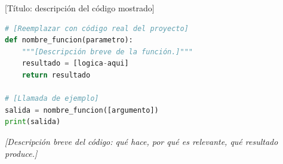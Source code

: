 \documentclass[aspectratio=169, 12pt]{beamer}
\begin{document}
\begin{frame}[fragile]{[Título: descripción del código mostrado]}
  \begin{tcolorbox}[cajaCode, top=2pt, bottom=2pt]
\begin{lstlisting}[language=Python]
# [Reemplazar con código real del proyecto]
def nombre_funcion(parametro):
    """[Descripción breve de la función.]"""
    resultado = [logica-aqui]
    return resultado

# [Llamada de ejemplo]
salida = nombre_funcion([argumento])
print(salida)
\end{lstlisting}
  \end{tcolorbox}
  {\small\color{GrisMedio}\itshape
    {[}Descripción breve del código: qué hace, por qué es relevante,
    qué resultado produce.{]}}
\end{frame}
\end{document}
